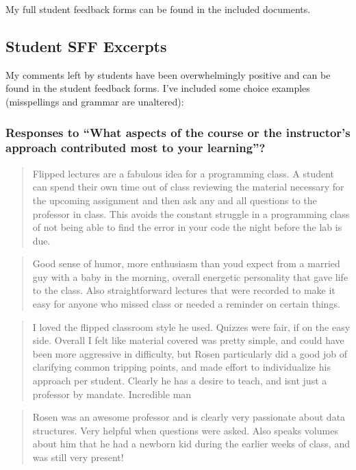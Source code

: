 \documentclass[10pt]{article}
\begin{document}
My full student feedback forms can be found in the included documents.
\subsection{Student SFF Excerpts}
My comments left by students have been overwhelmingly positive and can be found in the student feedback forms.
I've included some choice examples (misspellings and grammar are unaltered):

\subsubsection*{Responses to ``What aspects of the course or the instructor’s approach contributed most to your learning''?}

\begin{small}
	
\begin{quotation}
	Flipped lectures are a fabulous idea for a programming class. A student can spend their own time out of class reviewing the material necessary for the upcoming assignment and then ask any and all questions to the professor in class. This avoids the constant struggle in a programming class of not being able to find the error in your code the night before the lab is due.
\end{quotation}

\begin{quotation}
	Good sense of humor, more enthusiasm than youd expect from a married guy with a baby in the morning, overall energetic personality that gave life to the class. Also straightforward lectures that were recorded to make it easy for anyone who missed class or needed a reminder on certain things.
\end{quotation}

\begin{quote}
	 I loved the flipped classroom style he used. Quizzes were fair, if on the easy side. Overall I felt like material covered was pretty simple, and could have been more aggressive in difficulty, but Rosen particularly did a good job of clarifying common tripping points, and made effort to individualize his approach per student. Clearly he has a desire to teach, and isnt just a professor by mandate. Incredible man
	
\end{quote}

\begin{quotation}
	
	Rosen was an awesome professor and is clearly very passionate about data structures. Very helpful when questions were asked. Also speaks volumes about him that he had a newborn kid during the earlier weeks of class, and was still very present!
	

\end{quotation}
\end{small}
\end{document}
